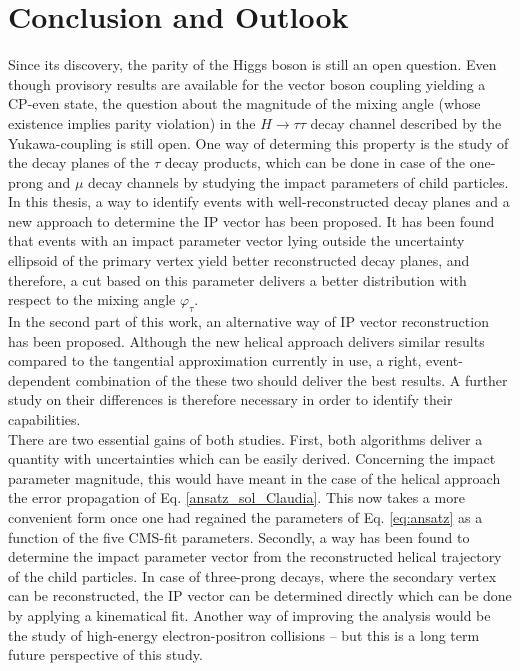 
\chapter{Conclusion and Outlook} %

\label{Chapter6} %
\label{sec:conclusion}

Since its discovery, the parity of the Higgs boson is still an open question. Even though provisory results are available for the vector boson coupling yielding a CP-even state, the question about the magnitude of the mixing angle (whose existence implies parity violation) in the $H\rightarrow\tau\tau$ decay channel described by the Yukawa-coupling is still open. One way of determing this property is the study of the decay planes of the $\tau$ decay products, which can be done in case of the one-prong and $\mu$ decay channels by studying the impact parameters of child particles.\\
In this thesis, a way to identify events with well-reconstructed decay planes and a new approach to determine the IP vector has been proposed. It has been found that events with an impact parameter vector lying outside the uncertainty ellipsoid of the primary vertex yield better reconstructed decay planes, and therefore, a cut based on this parameter delivers a better distribution with respect to the mixing angle $\varphi_\tau$.\\
In the second part of this work, an alternative way of IP vector reconstruction has been proposed. Although the new helical approach delivers similar results compared to the tangential approximation currently in use, a right, event-dependent combination of the these two should deliver the best results. A further study on their differences is therefore necessary in order to identify their capabilities.\\
There are two essential gains of both studies. First, both algorithms deliver a quantity with uncertainties which can be easily derived. Concerning the impact parameter magnitude, this would have meant in the case of the helical approach the error propagation of Eq. \ref{ansatz_sol_Claudia}. This now takes a more convenient form once one had regained the parameters of Eq. \ref{eq:ansatz} as a function of the five CMS-fit parameters. Secondly, a way has been found to determine the impact parameter vector from the reconstructed helical trajectory of the child particles.
In case of three-prong decays, where the secondary vertex can be reconstructed, the IP vector can be determined directly which can be done by applying a kinematical fit. Another way of improving the analysis would be the study of high-energy electron-positron collisions -- but this is a long term future perspective of this study.